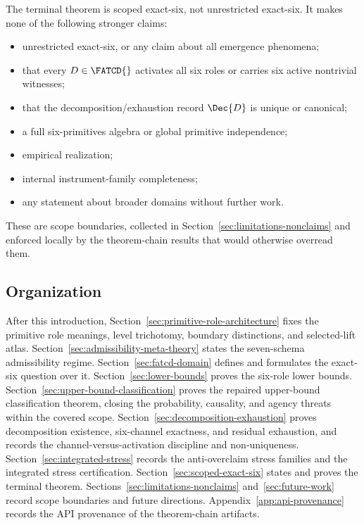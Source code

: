 The terminal theorem is scoped exact-six, not unrestricted exact-six.
It makes none of the following stronger claims:
\begin{itemize}[topsep=2pt,itemsep=1pt]
  \item unrestricted exact-six, or any claim about all emergence
    phenomena;
  \item that every \(D \in \FATCD{}\) activates all six roles or
    carries six active nontrivial witnesses;
  \item that the decomposition/exhaustion record \(\Dec{D}\) is unique
    or canonical;
  \item a full six-primitives algebra or global primitive
    independence;
  \item empirical realization;
  \item internal instrument-family completeness;
  \item any statement about broader domains without further work.
\end{itemize}
These are scope boundaries, collected in
Section~\ref{sec:limitations-nonclaims} and enforced locally by the
theorem-chain results that would otherwise overread them.

\subsection{Organization}\label{subsec:organization}

After this introduction, Section~\ref{sec:primitive-role-architecture}
fixes the primitive role meanings, level trichotomy, boundary
distinctions, and selected-lift atlas. Section~\ref{sec:admissibility-meta-theory}
states the seven-schema admissibility regime. Section~\ref{sec:fatcd-domain}
defines \FATCD{} and formulates the exact-six question over it.
Section~\ref{sec:lower-bounds} proves the six-role lower bounds.
Section~\ref{sec:upper-bound-classification} proves the repaired
upper-bound classification theorem, closing the probability,
causality, and agency threats within the covered scope.
Section~\ref{sec:decomposition-exhaustion} proves decomposition
existence, six-channel exactness, and residual exhaustion, and records
the channel-versus-activation discipline and non-uniqueness.
Section~\ref{sec:integrated-stress} records the anti-overclaim stress
families and the integrated stress certification.
Section~\ref{sec:scoped-exact-six} states and proves the terminal
theorem. Sections~\ref{sec:limitations-nonclaims}
and~\ref{sec:future-work} record scope boundaries and future
directions. Appendix~\ref{app:api-provenance} records the API
provenance of the theorem-chain artifacts.
